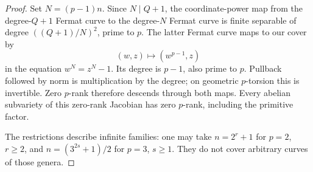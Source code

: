 \begin{proof}
Set $N=(p-1)n$. Since $N\mid Q+1$, the coordinate-power
map from the degree-$Q+1$ Fermat curve to the degree-$N$
Fermat curve is finite separable of degree
$((Q+1)/N)^2$, prime to $p$. The latter Fermat curve maps
to our cover by
\[
                     (w,z)\longmapsto (w^{p-1},z)
\]
in the equation $w^N=z^N-1$. Its degree is $p-1$, also
prime to $p$. Pullback followed by norm is multiplication
by the degree; on geometric $p$-torsion this is invertible.
Zero $p$-rank therefore descends through both maps.
Every abelian subvariety of this zero-rank Jacobian has
zero $p$-rank, including the primitive factor.

The restrictions describe infinite families: one may take
$n=2^r+1$ for $p=2$, $r\ge2$, and
$n=(3^{2s}+1)/2$ for $p=3$, $s\ge1$. They do not cover
arbitrary curves of those genera.
\end{proof}

